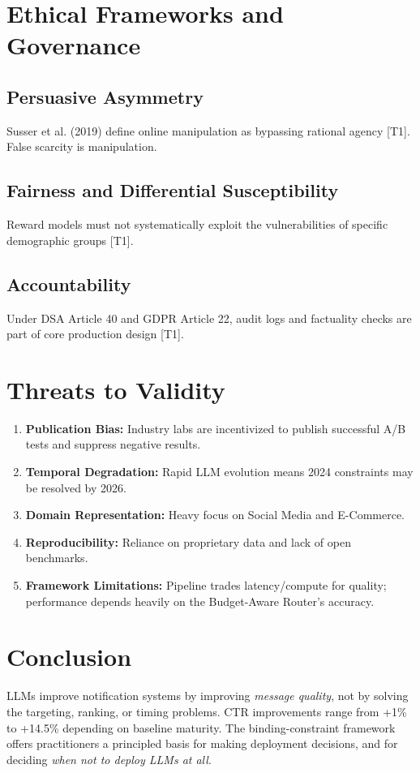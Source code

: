\documentclass[sigconf]{acmart}
\begin{document}
\section{Ethical Frameworks and Governance}

\subsection{Persuasive Asymmetry}
Susser et al. (2019) define online manipulation as bypassing rational agency \cite{susser2019technology} [T1]. False scarcity is manipulation.

\subsection{Fairness and Differential Susceptibility}
Reward models must not systematically exploit the vulnerabilities of specific demographic groups \cite{wang2023survey} [T1].

\subsection{Accountability}
Under DSA Article 40 and GDPR Article 22, audit logs and factuality checks are part of core production design \cite{fabbri2023ethical} [T1].

\section{Threats to Validity}

\begin{enumerate}
    \item \textbf{Publication Bias:} Industry labs are incentivized to publish successful A/B tests and suppress negative results.
    \item \textbf{Temporal Degradation:} Rapid LLM evolution means 2024 constraints may be resolved by 2026.
    \item \textbf{Domain Representation:} Heavy focus on Social Media and E-Commerce.
    \item \textbf{Reproducibility:} Reliance on proprietary data and lack of open benchmarks.
    \item \textbf{Framework Limitations:} Pipeline trades latency/compute for quality; performance depends heavily on the Budget-Aware Router's accuracy.
\end{enumerate}

\section{Conclusion}

LLMs improve notification systems by improving \textit{message quality}, not by solving the targeting, ranking, or timing problems. CTR improvements range from +1\% to +14.5\% depending on baseline maturity. The binding-constraint framework offers practitioners a principled basis for making deployment decisions, and for deciding \textit{when not to deploy LLMs at all}.



\end{document}
